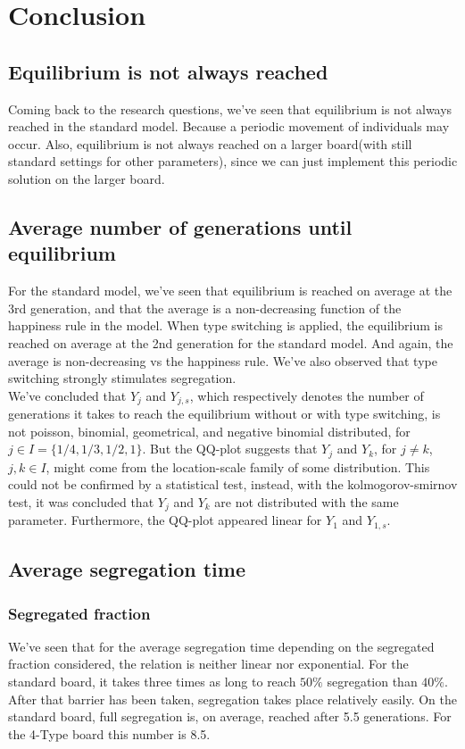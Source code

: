 \section{Conclusion}
\subsection{Equilibrium is not always reached}
Coming back to the research questions, we've seen that equilibrium is not always reached in the standard model. Because a periodic movement of individuals may occur. Also, equilibrium is not always reached on a larger board(with still standard settings for other parameters), since we can just implement this periodic solution on the larger board.\\

\subsection{Average number of generations until equilibrium}
For the standard model, we've seen that equilibrium is reached on average at the 3rd generation, and that the average is a non-decreasing function of the happiness rule in the model. When type switching is applied, the equilibrium is reached on average at the 2nd generation for the standard model. And again, the average is non-decreasing vs the happiness rule. We've also observed that type switching strongly stimulates segregation.\\

We've concluded that $Y_j$ and $Y_{j,s}$, which respectively denotes the number of generations it takes to reach the equilibrium without or with type switching, is not poisson, binomial, geometrical, and negative binomial distributed, for $j\in I=\{1/4, 1/3, 1/2 ,1\}$. But the QQ-plot suggests that $Y_j$ and $Y_k$, for $j\neq k$, $j,k\in I$, might come from the location-scale family of some distribution. This could not be confirmed by a statistical test, instead, with the kolmogorov-smirnov test, it was concluded that $Y_j$ and $Y_k$ are not distributed with the same parameter. Furthermore, the QQ-plot appeared linear for $Y_1$ and $Y_{1,s}$.\\

\subsection{Average segregation time}

\subsubsection*{Segregated fraction}
We've seen that for the average segregation time depending on the segregated fraction considered, the relation is neither linear nor exponential. For the standard board, it takes three times as long to reach $50\%$ segregation than $40\%$. After that barrier has been taken, segregation takes place relatively easily. On the standard board, full segregation is, on average, reached after 5.5 generations. For the 4-Type board this number is 8.5.

